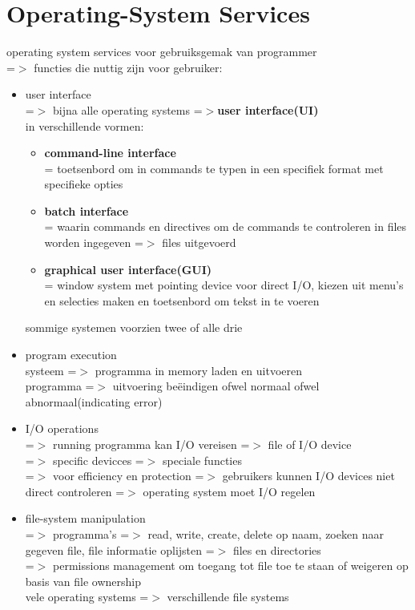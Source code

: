 \documentclass{report}
\begin{document}
\section{Operating-System Services}
operating system services voor gebruiksgemak van programmer
\\=$>$ functies die nuttig zijn voor gebruiker:
\begin{itemize}
\item user interface
\\ =$>$ bijna alle operating systems =$>$\textbf{user interface(UI)}
\\in verschillende vormen:
\begin{itemize}
\item \textbf{command-line interface}
\\= toetsenbord om in commands te typen in een specifiek format met specifieke opties
\item \textbf{batch interface}
\\= waarin commands en directives om de commands te controleren in files worden ingegeven =$>$ files uitgevoerd
\item \textbf{graphical user interface(GUI)}
\\= window system met pointing device voor direct I/O, kiezen uit menu's en selecties maken en toetsenbord om tekst in te voeren
\end{itemize}
sommige systemen voorzien twee of alle drie
\item program execution
\\systeem =$>$ programma in memory laden en uitvoeren
\\programma =$>$ uitvoering be\"eindigen ofwel normaal ofwel abnormaal(indicating error)
\item I/O operations
\\=$>$ running programma kan I/O vereisen =$>$ file of I/O device
\\=$>$ specific devicces =$>$ speciale functies
\\=$>$ voor efficiency en protection =$>$ gebruikers kunnen I/O devices niet direct controleren =$>$ operating system moet I/O regelen
\item file-system manipulation
\\=$>$ programma's =$>$ read, write, create, delete op naam, zoeken naar gegeven file, file informatie oplijsten =$>$ files en directories
\\=$>$ permissions management om toegang tot file toe te staan of weigeren op basis van file ownership 
\\vele operating systems =$>$ verschillende file systems

\end{itemize}
\end{document}
